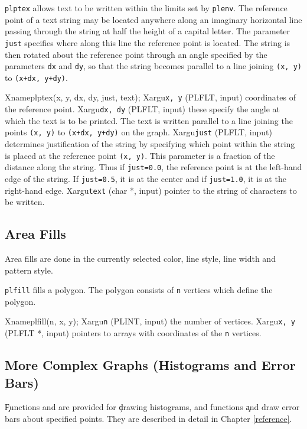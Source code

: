 {\tt plptex} allows text to be written within the limits set by
{\tt plenv}. The reference point of a text string may be located
anywhere along an imaginary horizontal line passing through the string
at half the height of a capital letter. The parameter {\tt just} specifies
where along this line the reference point is located. The string is then
rotated about the reference point through an angle specified by the
parameters {\tt dx} and {\tt dy}, so that the string becomes parallel
to a line joining {\tt (x, y)} to {\tt (x+dx, y+dy)}.

Xname{plptex(x, y, dx, dy, just, text);}
Xargu{{\tt x, y} (PLFLT, input)}
{coordinates of the reference point.}
Xargu{{\tt dx, dy} (PLFLT, input)}
{these specify the angle at which the text is to be printed. The text is
 written parallel to a line joining the points {\tt (x, y)} to
 {\tt (x+dx, y+dy)} on the graph.}
Xargu{{\tt just} (PLFLT, input)}
{determines justification of the string by specifying which point within
 the string is placed at the reference point {\tt (x, y)}. This parameter
 is a fraction of the distance along the string. Thus if {\tt just=0.0}, 
 the reference point is at the left-hand edge of the string.
 If {\tt just=0.5}, it is at the center and if {\tt just=1.0}, it is at
 the right-hand edge.}
Xargu{{\tt text} (char *, input)}
{pointer to the string of characters to be written.}

\subsection {Area Fills}

Area fills are done in
the currently selected color, line style, line width and pattern style.

{\tt plfill} fills a polygon. The polygon consists of {\tt n}
vertices which define the polygon.

Xname{plfill(n, x, y);}
Xargu{{\tt n} (PLINT, input)}
{the number of vertices.}
Xargu{{\tt x, y} (PLFLT *, input)}
{pointers to arrays with coordinates of the {\tt n} vertices.}


\subsection {More Complex Graphs (Histograms and Error Bars)}

\c Functions  and  are provided for
\c drawing histograms, and functions 
\c and  draw error bars about specified
points. They are described in detail in Chapter \ref{reference}.

